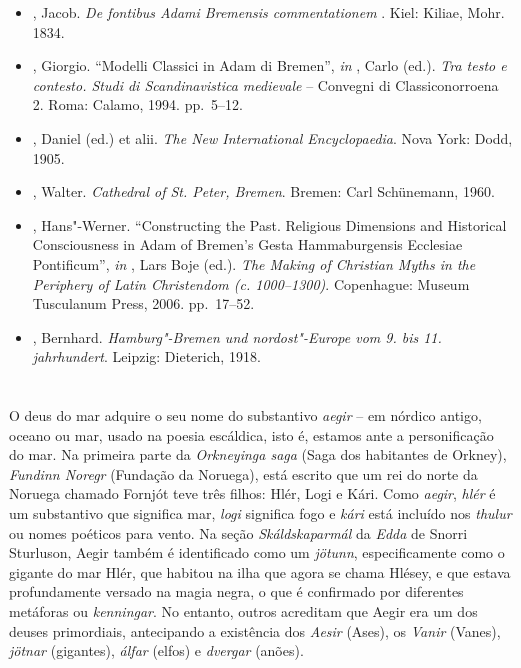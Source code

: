 \begin{itemize}\footnotesize{}
\item
  , Jacob. \emph{De fontibus Adami Bremensis commentationem
  \redondo{[…]}}. Kiel: Kiliae, Mohr. 1834.
\item
  , Giorgio. ``Modelli Classici in Adam di Bremen'', \emph{in}  , Carlo (ed.). \emph{Tra testo e
  contesto. Studi di Scandinavistica medievale} --  Convegni di
  Classiconorroena 2. Roma: Calamo, 1994. pp.~5--12.
\item
  , Daniel (ed.) et alii. \emph{The New International
  Encyclopaedia}. Nova York: Dodd, 1905.
\item
  , Walter. \emph{Cathedral of St. Peter, Bremen}. 
  Bremen: Carl Schünemann, 1960.
\item
  , Hans"-Werner. ``Constructing the Past. Religious Dimensions and
  Historical Consciousness in Adam of Bremen's Gesta Hammaburgensis
  Ecclesiae Pontificum'', \emph{in}  , Lars Boje (ed.). \emph{The Making
  of Christian Myths in the Periphery of Latin Christendom (c.
  1000--1300)}. Copenhague: Museum Tusculanum Press, 2006. pp.~17--52.
\item
  , Bernhard. \emph{Hamburg"-Bremen und nordost"-Europe vom 9.
  bis 11. jahrhundert}. Leipzig: Dieterich, 1918.
\end{itemize}

\section{}

O deus do mar adquire o seu nome do substantivo \emph{aegir} -- em
nórdico antigo, oceano ou mar, usado na poesia escáldica, isto é,
estamos ante a personificação do mar. Na primeira parte da
\emph{Orkneyinga saga} (Saga dos habitantes de Orkney), \emph{Fundinn
Noregr} (Fundação da Noruega), está escrito que um rei do norte da
Noruega chamado Fornjót teve três filhos: Hlér, Logi e Kári. Como
\emph{aegir}, \emph{hlér} é um substantivo que significa mar,
\emph{logi} significa fogo e \emph{kári} está incluído nos \emph{thulur}
ou nomes poéticos para vento. Na seção \emph{Skáldskaparmál} da
\emph{Edda} de Snorri Sturluson, Aegir também é identificado como um
\emph{jötunn}, especificamente como o gigante do mar Hlér, que habitou
na ilha que agora se chama Hlésey, e que estava profundamente versado na
magia negra, o que é confirmado por diferentes metáforas ou
\emph{kenningar}. No entanto, outros acreditam que Aegir era um dos
deuses primordiais, antecipando a existência dos \emph{Aesir} (Ases), os
\emph{Vanir} (Vanes), \emph{jötnar} (gigantes), \emph{álfar} (elfos) e
\emph{dvergar} (anões).

